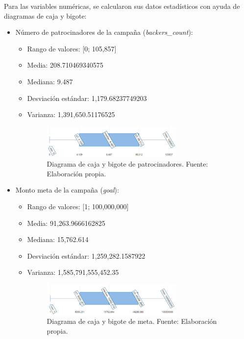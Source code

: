 Para las variables numéricas, se calcularon sus datos estadísticos con ayuda de diagramas de caja y bigote:
\begin{itemize}
	\item Número de patrocinadores de la campaña (\textit{backers\_count}):
	\begin{itemize}
		\item Rango de valores: [0; 105,857]
		\item Media: 208.710469340575
		\item Mediana: 9.487
		\item Desviación estándar: 1,179.68237749203
		\item Varianza: 1,391,650.51176525
		\begin{figure}[!ht]
			\begin{center}
				\includegraphics[width=0.7\textwidth]{4/figures/caja_bigote_backers.png}
				\caption{Diagrama de caja y bigote de patrocinadores. Fuente: Elaboración propia.}
				\label{4:fig17}
			\end{center}
		\end{figure}
	\end{itemize}
	\item Monto meta de la campaña (\textit{goal}):
	\begin{itemize}
		\item Rango de valores: [1; 100,000,000]
		\item Media: 91,263.9666162825
		\item Mediana: 15,762.614
		\item Desviación estándar: 1,259,282.1587922
		\item Varianza: 1,585,791,555,452.35
		\begin{figure}[!ht]
			\begin{center}
				\includegraphics[width=0.7\textwidth]{4/figures/caja_bigote_goal.png}
				\caption{Diagrama de caja y bigote de meta. Fuente: Elaboración propia.}
				\label{4:fig18}
			\end{center}

\end{figure}
\end{itemize}
\end{itemize}
